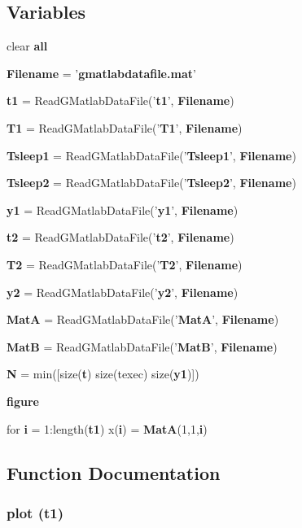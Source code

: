 \subsection*{Variables}
\begin{DoxyCompactItemize}
\item 
clear {\bf all}
\item 
{\bf Filename} = '{\bf gmatlabdatafile.mat}'
\item 
{\bf t1} = ReadGMatlabDataFile('{\bf t1}', {\bf Filename})
\item 
{\bf T1} = ReadGMatlabDataFile('{\bf T1}', {\bf Filename})
\item 
{\bf Tsleep1} = ReadGMatlabDataFile('{\bf Tsleep1}', {\bf Filename})
\item 
{\bf Tsleep2} = ReadGMatlabDataFile('{\bf Tsleep2}', {\bf Filename})
\item 
{\bf y1} = ReadGMatlabDataFile('{\bf y1}', {\bf Filename})
\item 
{\bf t2} = ReadGMatlabDataFile('{\bf t2}', {\bf Filename})
\item 
{\bf T2} = ReadGMatlabDataFile('{\bf T2}', {\bf Filename})
\item 
{\bf y2} = ReadGMatlabDataFile('{\bf y2}', {\bf Filename})
\item 
{\bf MatA} = ReadGMatlabDataFile('{\bf MatA}', {\bf Filename})
\item 
{\bf MatB} = ReadGMatlabDataFile('{\bf MatB}', {\bf Filename})
\item 
{\bf N} = min([size({\bf t}) size(texec) size({\bf y1})])
\item 
{\bf figure}
\item 
for {\bf i} = 1:length({\bf t1}) x({\bf i}) = {\bf MatA}(1,1,{\bf i})
\end{DoxyCompactItemize}


\subsection{Function Documentation}
\subsubsection[{plot}]{\setlength{\rightskip}{0pt plus 5cm}plot ({\bf t1})}\label{libs_2gdatalogger_2demo-xenomai_2matlabdatafiles_2demo_8m_aeb7e049ef17bcf2369b0efd79c029f98}
